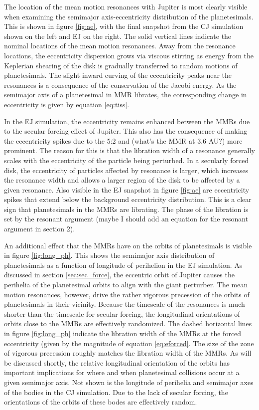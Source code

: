 \documentclass[twocolumn]{aastex63}
\begin{document}
The location of the mean motion resonances with Jupiter is most clearly visible when examining the semimajor axis-eccentricity distribution of the planetesimals. This is shown in figure \ref{fig:ae}, with the final snapshot from the CJ simulation shown on the left and EJ on the right. The solid vertical lines indicate the nominal locations of the mean motion resonances. Away from the resonance locations, the eccentricity dispersion grows via viscous stirring as energy from the Keplerian shearing of the disk is gradually transferred to random motions of planetesimals. The slight inward curving of the eccentricity peaks near the resonances is a consequence of the conservation of the Jacobi energy. As the semimajor axis of a planetesimal in MMR librates, the corresponding change in eccentricity is given by equation \ref{eq:tiss}.

In the EJ simulation, the eccentricity remains enhanced between the MMRs due to the secular forcing effect of Jupiter. This also has the consequence of making the eccentricity spikes due to the 5:2 and (what's the MMR at 3.6 AU?) more prominent. The reason for this is that the libration width of a resonance generally scales with the eccentricity of the particle being perturbed. In a secularly forced disk, the eccentricity of particles affected by resonance is larger, which increases the resonance width and allows a larger region of the disk to be affected by a given resonance. Also visible in the EJ snapshot in figure \ref{fig:ae} are eccentricity spikes that extend below the background eccentricity distribution. This is a clear sign that planetesimals in the MMRs are librating. The phase of the libration is set by the resonant argument (maybe I should add an equation for the resonant argument in section 2).

An additional effect that the MMRs have on the orbits of planetesimals is visible in figure \ref{fig:long_ph}. This shows the semimajor axis distribution of planetesimals as a function of longitude of perihelion in the EJ simulation. As discussed in section \ref{sec:sec_force}, the eccentric orbit of Jupiter causes the perihelia of the planetesimal orbits to align with the giant perturber. The mean motion resonances, however, drive the rather vigorous precession of the orbits of planetesimals in their vicinity. Because the timescale of the resonances is much shorter than the timescale for secular forcing, the longitudinal orientations of orbits close to the MMRs are effectively randomized. The dashed horizontal lines in figure \ref{fig:long_ph} indicate the libration width of the MMRs at the forced eccentricity (given by the magnitude of equation \ref{eq:eforced}. The size of the zone of vigorous precession roughly matches the libration width of the MMRs. As will be discussed shortly, the relative longitudinal orientation of the orbits has important implications for where and when planetesimal collisions occur at a given semimajor axis. Not shown is the longitude of perihelia and semimajor axes of the bodies in the CJ simulation. Due to the lack of secular forcing, the orientations of the orbits of these bodes are effectively random.
\end{document}

